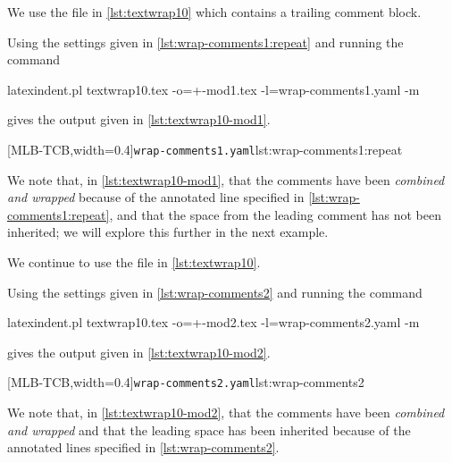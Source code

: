 \documentclass[10pt]{article}
\begin{document}
 \begin{example}
 We use the file in \cref{lst:textwrap10} which contains a trailing comment block.


 Using the settings given in \cref{lst:wrap-comments1:repeat} and running the command

 \begin{commandshell}
latexindent.pl textwrap10.tex -o=+-mod1.tex -l=wrap-comments1.yaml -m
   \end{commandshell}

 gives the output given in \cref{lst:textwrap10-mod1}.

 \begin{cmhtcbraster}[raster columns=2,
   raster left skip=-1.5cm,
   raster right skip=-0cm,
   raster column skip=.06\linewidth]
  [MLB-TCB,width=0.4\linewidth]{\texttt{wrap-comments1.yaml}}{lst:wrap-comments1:repeat}
 \end{cmhtcbraster}

 We note that, in \cref{lst:textwrap10-mod1}, that the comments have been \emph{combined
 and wrapped} because of the annotated line specified in
 \cref{lst:wrap-comments1:repeat}, and that the space from the leading comment has not
 been inherited; we will explore this further in the next example.
 \end{example}

 \begin{example}
 We continue to use the file in \cref{lst:textwrap10}.

 Using the settings given in \cref{lst:wrap-comments2} and running the command

 \begin{commandshell}
latexindent.pl textwrap10.tex -o=+-mod2.tex -l=wrap-comments2.yaml -m
   \end{commandshell}

 gives the output given in \cref{lst:textwrap10-mod2}.

 \begin{cmhtcbraster}[raster columns=2,
   raster left skip=-1.5cm,
   raster right skip=-0cm,
   raster column skip=.06\linewidth]
  [MLB-TCB,width=0.4\linewidth]{\texttt{wrap-comments2.yaml}}{lst:wrap-comments2}
 \end{cmhtcbraster}

 We note that, in \cref{lst:textwrap10-mod2}, that the comments have been \emph{combined
 and wrapped} and that the leading space has been inherited because of the annotated
 lines specified in \cref{lst:wrap-comments2}.
 \end{example}
\end{document}
